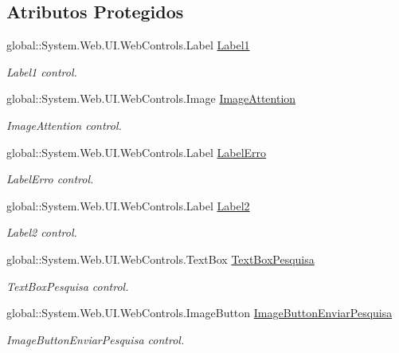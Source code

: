 \subsection*{Atributos Protegidos}
\begin{DoxyCompactItemize}
\item 
global::System.Web.UI.WebControls.Label \hyperlink{class_sistema_r_h_1_1_pesquisar_a170f9006967454b5b0bda89191fe4555}{Label1}
\begin{DoxyCompactList}\small\item\em Label1 control. \item\end{DoxyCompactList}\item 
global::System.Web.UI.WebControls.Image \hyperlink{class_sistema_r_h_1_1_pesquisar_a131eb4f5f365d86398a16541cfa83920}{ImageAttention}
\begin{DoxyCompactList}\small\item\em ImageAttention control. \item\end{DoxyCompactList}\item 
global::System.Web.UI.WebControls.Label \hyperlink{class_sistema_r_h_1_1_pesquisar_afd48762baccfaf1cc5996bd2d7646839}{LabelErro}
\begin{DoxyCompactList}\small\item\em LabelErro control. \item\end{DoxyCompactList}\item 
global::System.Web.UI.WebControls.Label \hyperlink{class_sistema_r_h_1_1_pesquisar_a873d1b813fa7f47e8b18a9a1bb7b2d18}{Label2}
\begin{DoxyCompactList}\small\item\em Label2 control. \item\end{DoxyCompactList}\item 
global::System.Web.UI.WebControls.TextBox \hyperlink{class_sistema_r_h_1_1_pesquisar_ad167e10b78a58d8192c25cb0125dc20d}{TextBoxPesquisa}
\begin{DoxyCompactList}\small\item\em TextBoxPesquisa control. \item\end{DoxyCompactList}\item 
global::System.Web.UI.WebControls.ImageButton \hyperlink{class_sistema_r_h_1_1_pesquisar_ada5643710f0e8e14d2c54c7efeb968a1}{ImageButtonEnviarPesquisa}
\begin{DoxyCompactList}\small\item\em ImageButtonEnviarPesquisa control. \item\end{DoxyCompactList}\item 

\end{DoxyCompactItemize}

